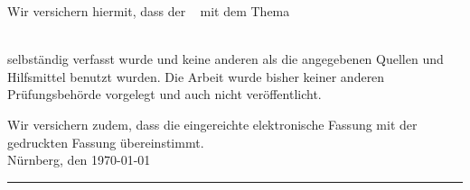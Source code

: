 Wir versichern hiermit, dass der \arbeit~ mit dem Thema

\emph{\titel}\\
selbständig verfasst wurde und keine anderen als die angegebenen Quellen und Hilfsmittel benutzt wurden. Die Arbeit wurde bisher keiner anderen Prüfungsbehörde vorgelegt und auch nicht veröffentlicht.


Wir versichern zudem, dass die eingereichte elektronische Fassung mit der gedruckten Fassung übereinstimmt.\\[10ex]

Nürnberg, den \today \\[4ex]


\rule[-0.2cm]{10cm}{0.5pt} \\

\textsc{\autor} \\[10ex]
